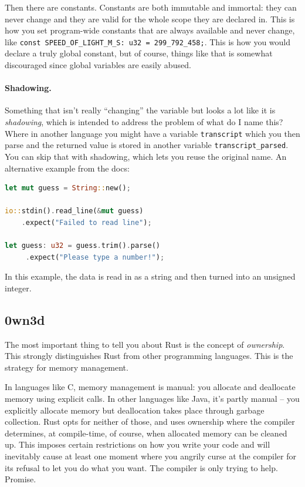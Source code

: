 \documentclass[a4paper]{report}
\begin{document}
Then there are constants. Constants are both immutable and immortal: they can never change and they are valid for the whole scope they are declared in. This is how you set program-wide constants that are always available and never change, like \texttt{const SPEED\_OF\_LIGHT\_M\_S: u32 = 299\_792\_458;}. This is how you would declare a truly global constant, but of course, things like that is somewhat discouraged since global variables are easily abused.

\paragraph{Shadowing.}
Something that isn't really ``changing'' the variable but looks a lot like it is \textit{shadowing}, which is intended to address the problem of what do I name this? Where in another language you might have a variable \texttt{transcript} which you then parse and the returned value is stored in another variable \texttt{transcript\_parsed}. You can skip that with shadowing, which lets you reuse the original name. An alternative example from the docs:

\begin{lstlisting}[language=Rust]
let mut guess = String::new();

io::stdin().read_line(&mut guess)
    .expect("Failed to read line");

let guess: u32 = guess.trim().parse()
     .expect("Please type a number!");
\end{lstlisting}

In this example, the data is read in as a string and then turned into an unsigned integer.

\subsection*{0wn3d} The most important thing to tell you about Rust is the concept of \textit{ownership}. This strongly distinguishes Rust from other programming languages. This is the strategy for memory management. 

In languages like C, memory management is manual: you allocate and deallocate memory using explicit calls. In other languages like Java, it's partly manual -- you explicitly allocate memory but deallocation takes place through garbage collection. Rust opts for neither of those, and uses ownership where the compiler determines, at compile-time, of course, when allocated memory can be cleaned up. This imposes certain restrictions on how you write your code and will inevitably cause at least one moment where you angrily curse at the compiler for its refusal to let you do what you want. The compiler is only trying to help. Promise.
\end{document}
